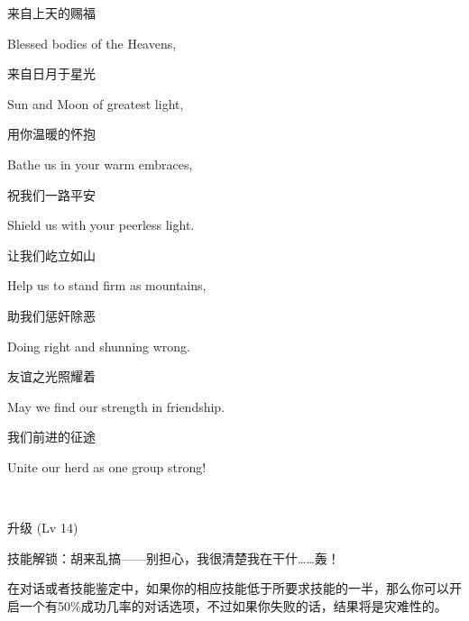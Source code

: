 \begin{song}
    来自上天的赐福
    
    Blessed bodies of the Heavens,
    
    \medskip

    来自日月于星光
    
    Sun and Moon of greatest light,
    
    \medskip

    用你温暖的怀抱
    
    Bathe us in your warm embraces,
    
    \medskip

    祝我们一路平安
    
    Shield us with your peerless light.
    
    \medskip

    让我们屹立如山
    
    Help us to stand firm as mountains,
    
    \medskip

    助我们惩奸除恶
    
    Doing right and shunning wrong.
    
    \medskip

    友谊之光照耀着
    
    May we find our strength in friendship.
    
    \medskip

    我们前进的征途
    
    Unite our herd as one group strong!
\end{song}

\clearpage

~\vfill

\begin{note}
    升级 (Lv 14) 

    技能解锁：胡来乱搞——别担心，我很清楚我在干什……轰！   

    在对话或者技能鉴定中，如果你的相应技能低于所要求技能的一半，那么你可以开启一个有50\%成功几率的对话选项，不过如果你失败的话，结果将是灾难性的。
\end{note}





